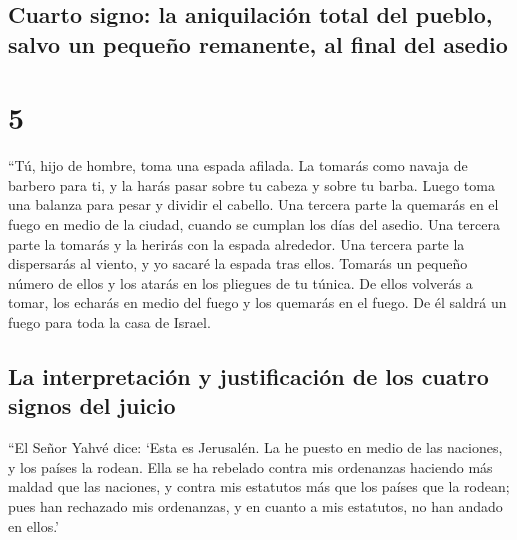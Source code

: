 \hypertarget{cuarto-signo-la-aniquilaciuxf3n-total-del-pueblo-salvo-un-pequeuxf1o-remanente-al-final-del-asedio}{%
\subsection{Cuarto signo: la aniquilación total del pueblo, salvo un
pequeño remanente, al final del
asedio}\label{cuarto-signo-la-aniquilaciuxf3n-total-del-pueblo-salvo-un-pequeuxf1o-remanente-al-final-del-asedio}}

\hypertarget{section-4}{%
\section{5}\label{section-4}}

 ``Tú, hijo de hombre, toma una espada afilada. La tomarás
como navaja de barbero para ti, y la harás pasar sobre tu cabeza y sobre
tu barba. Luego toma una balanza para pesar y dividir el cabello.
 Una tercera parte la quemarás en el fuego en medio de la
ciudad, cuando se cumplan los días del asedio. Una tercera parte la
tomarás y la herirás con la espada alrededor. Una tercera parte la
dispersarás al viento, y yo sacaré la espada tras ellos. 
Tomarás un pequeño número de ellos y los atarás en los pliegues de tu
túnica.  De ellos volverás a tomar, los echarás en medio
del fuego y los quemarás en el fuego. De él saldrá un fuego para toda la
casa de Israel.

\hypertarget{la-interpretaciuxf3n-y-justificaciuxf3n-de-los-cuatro-signos-del-juicio}{%
\subsection{La interpretación y justificación de los cuatro signos del
juicio}\label{la-interpretaciuxf3n-y-justificaciuxf3n-de-los-cuatro-signos-del-juicio}}

 ``El Señor Yahvé dice: `Esta es Jerusalén. La he puesto
en medio de las naciones, y los países la rodean.  Ella se
ha rebelado contra mis ordenanzas haciendo más maldad que las naciones,
y contra mis estatutos más que los países que la rodean; pues han
rechazado mis ordenanzas, y en cuanto a mis estatutos, no han andado en
ellos.'

